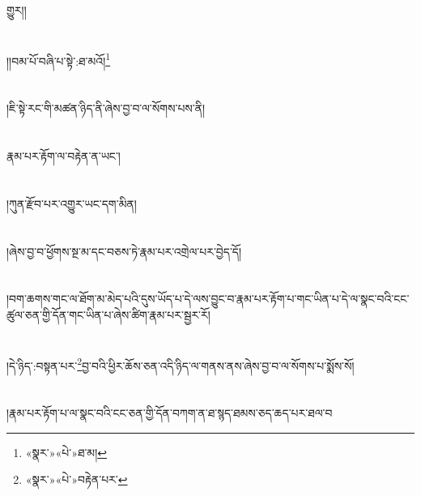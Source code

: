 གྱུར།།\chapter{ }།།བམ་པོ་བཞི་པ་སྟེ་:ཐ་མའོ།\footnote{«སྣར་»«པེ་»ཐ་མ།}\chapter{ }།ཇི་སྟེ་རང་གི་མཚན་ཉིད་ནི་ཞེས་བྱ་བ་ལ་སོགས་པས་ནི།\chapter{ }རྣམ་པར་རྟོག་ལ་བརྟེན་ན་ཡང་།\chapter{ }།ཀུན་རྫོབ་པར་འགྱུར་ཡང་དག་མིན།\chapter{ }།ཞེས་བྱ་བ་ཕྱོགས་སྔ་མ་དང་བཅས་ཏེ་རྣམ་པར་འགྲེལ་པར་བྱེད་དོ།\chapter{ }།བག་ཆགས་གང་ལ་ཐོག་མ་མེད་པའི་དུས་ཡོད་པ་དེ་ལས་བྱུང་བ་རྣམ་པར་རྟོག་པ་གང་ཡིན་པ་དེ་ལ་སྣང་བའི་ངང་ཚུལ་ཅན་གྱི་དོན་གང་ཡིན་པ་ཞེས་ཚིག་རྣམ་པར་སྦྱར་རོ།\chapter{ }།དེ་ཉིད་:བསྟན་པར་\footnote{«སྣར་»«པེ་»བརྟེན་པར་}བྱ་བའི་ཕྱིར་ཆོས་ཅན་འདི་ཉིད་ལ་གནས་ནས་ཞེས་བྱ་བ་ལ་སོགས་པ་སྨོས་སོ།\chapter{ }།རྣམ་པར་རྟོག་པ་ལ་སྣང་བའི་ངང་ཅན་གྱི་དོན་བཀག་ན་ཐ་སྙད་ཐམས་ཅད་ཆད་པར་ཐལ་བ